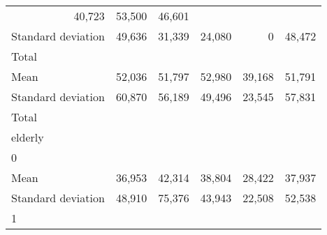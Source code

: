 \begin{tabular}{llllll}
  \multicolumn{1}{r}{40,723} &
  \multicolumn{1}{r}{53,500} &
  \multicolumn{1}{r}{46,601} \\
\multicolumn{1}{l}{\hspace{4em}Standard deviation} &
  \multicolumn{1}{|r}{49,636} &
  \multicolumn{1}{r}{31,339} &
  \multicolumn{1}{r}{24,080} &
  \multicolumn{1}{r}{0} &
  \multicolumn{1}{r}{48,472} \\
\multicolumn{1}{l}{\hspace{3em}Total} &
  \multicolumn{1}{|r}{} &
  \multicolumn{1}{r}{} &
  \multicolumn{1}{r}{} &
  \multicolumn{1}{r}{} &
  \multicolumn{1}{r}{} \\
\multicolumn{1}{l}{\hspace{4em}Mean} &
  \multicolumn{1}{|r}{52,036} &
  \multicolumn{1}{r}{51,797} &
  \multicolumn{1}{r}{52,980} &
  \multicolumn{1}{r}{39,168} &
  \multicolumn{1}{r}{51,791} \\
\multicolumn{1}{l}{\hspace{4em}Standard deviation} &
  \multicolumn{1}{|r}{60,870} &
  \multicolumn{1}{r}{56,189} &
  \multicolumn{1}{r}{49,496} &
  \multicolumn{1}{r}{23,545} &
  \multicolumn{1}{r}{57,831} \\
\multicolumn{1}{l}{\hspace{1em}Total} &
  \multicolumn{1}{|r}{} &
  \multicolumn{1}{r}{} &
  \multicolumn{1}{r}{} &
  \multicolumn{1}{r}{} &
  \multicolumn{1}{r}{} \\
\multicolumn{1}{l}{\hspace{2em}elderly} &
  \multicolumn{1}{|r}{} &
  \multicolumn{1}{r}{} &
  \multicolumn{1}{r}{} &
  \multicolumn{1}{r}{} &
  \multicolumn{1}{r}{} \\
\multicolumn{1}{l}{\hspace{3em}0} &
  \multicolumn{1}{|r}{} &
  \multicolumn{1}{r}{} &
  \multicolumn{1}{r}{} &
  \multicolumn{1}{r}{} &
  \multicolumn{1}{r}{} \\
\multicolumn{1}{l}{\hspace{4em}Mean} &
  \multicolumn{1}{|r}{36,953} &
  \multicolumn{1}{r}{42,314} &
  \multicolumn{1}{r}{38,804} &
  \multicolumn{1}{r}{28,422} &
  \multicolumn{1}{r}{37,937} \\
\multicolumn{1}{l}{\hspace{4em}Standard deviation} &
  \multicolumn{1}{|r}{48,910} &
  \multicolumn{1}{r}{75,376} &
  \multicolumn{1}{r}{43,943} &
  \multicolumn{1}{r}{22,508} &
  \multicolumn{1}{r}{52,538} \\
\multicolumn{1}{l}{\hspace{3em}1} &

\end{tabular}

